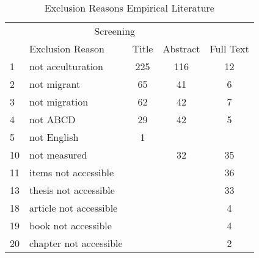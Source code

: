 \begin{table}
\begin{minipage}[t][\textheight][t]{\textwidth}

\caption{\label{tab:EmpiricalExclusion}Exclusion Reasons Empirical Literature}
\begin{tabular}[t]{llccc}
\toprule
\multicolumn{1}{c}{ } & \multicolumn{3}{c}{Screening} \\
\cmidrule(l{3pt}r{3pt}){2-4}
  & Exclusion Reason & Title & Abstract & Full Text\\
\midrule
1 & not acculturation & 225 & 116 & 12\\
2 & not migrant & 65 & 41 & 6\\
3 & not migration & 62 & 42 & 7\\
4 & not ABCD & 29 & 42 & 5\\
5 & not English & 1 &  & \\
10 & not measured &  & 32 & 35\\
11 & items not accessible &  &  & 36\\
13 & thesis not accessible &  &  & 33\\
18 & article not accessible &  &  & 4\\
19 & book not accessible &  &  & 4\\
20 & chapter not accessible &  &  & 2\\
\bottomrule
\end{tabular}
\end{minipage}
\end{table}
